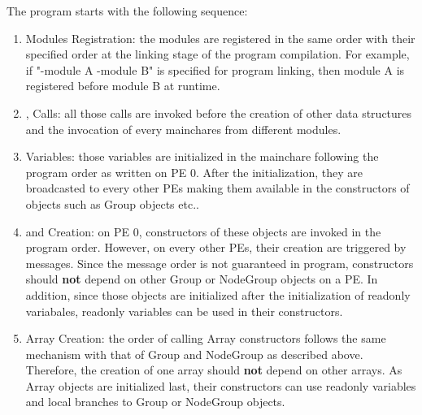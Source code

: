 
The \charmpp{} program starts with the following sequence:
\begin{enumerate}
\item Modules Registration: the modules are registered in the same order with
their specified order at the linking stage of the program compilation.
For example, if "-module A -module B" is specified for \charmpp{} program
linking, then module A is registered before module B at runtime.

\item {}, Calls: all those calls are invoked before the
creation of other \charmpp{} data structures and the invocation of every
mainchares from different modules.

\item {} Variables: those variables are initialized in the mainchare following the program order as written on PE 0. After the initialization, they
are broadcasted to every other PEs making them available in the constructors
of \charmpp{} objects such as Group objects etc..

\item {} and  Creation: on PE 0, constructors of these
objects are invoked in the program order. However, on every other PEs, their
creation are triggered by messages. Since the message order is not guaranteed
in \charmpp{} program, constructors should \textbf{not} depend on other Group
or NodeGroup objects on a PE. In addition, since those objects are initialized
after the initialization of readonly variabales, readonly variables can be used
in their constructors.

\item \charmpp{} Array Creation: the order of calling Array constructors follows
the same mechanism with that of Group and NodeGroup as described above.
Therefore, the creation of one array should \textbf{not} depend on other arrays.
As Array objects are initialized last, their constructors can use 
readonly variables and local branches to Group or NodeGroup objects.
\end{enumerate}
